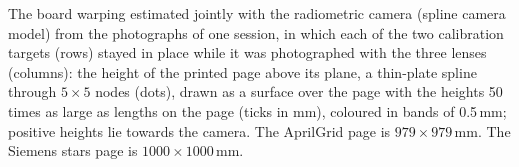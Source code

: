 The board warping estimated jointly with the radiometric camera (spline camera model) from the photographs of one session, in which each of the two calibration targets (rows) stayed in place while it was photographed with the three lenses (columns): the height of the printed page above its plane, a thin-plate spline through $5\times5$ nodes (dots), drawn as a surface over the page with the heights 50 times as large as lengths on the page (ticks in mm), coloured in bands of 0.5\,mm; positive heights lie towards the camera. The AprilGrid page is $979\times979$\,mm. The Siemens stars page is $1000\times1000$\,mm.
